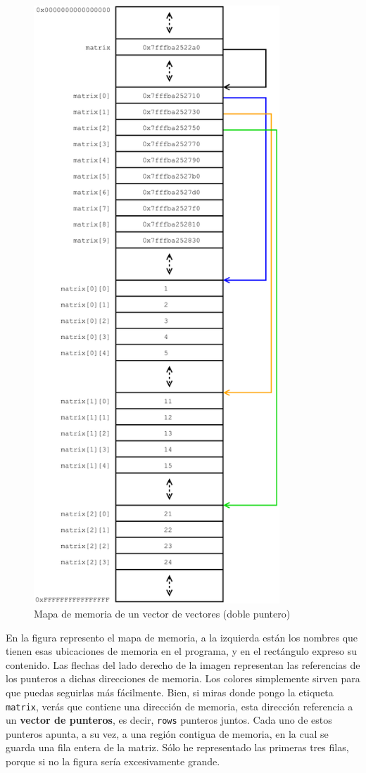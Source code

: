 \documentclass[a4paper]{article}
\begin{document}
\begin{figure}[H]
    \center
    \includegraphics[height=225mm]{double_pointer_map}
    \caption{Mapa de memoria de un vector de vectores (doble puntero)}
    \label{img:double_pointer_map}
\end{figure}

En la figura represento el mapa de memoria, a la izquierda están los nombres
que tienen esas ubicaciones de memoria en el programa, y en el rectángulo
expreso su contenido. Las flechas del lado derecho de la imagen representan las
referencias de los punteros a dichas direcciones de memoria. Los colores
simplemente sirven para que puedas seguirlas más fácilmente. Bien, si miras
donde pongo la etiqueta \verb!matrix!, verás que contiene una dirección de
memoria, esta dirección referencia a un \textbf{vector de punteros}, es decir,
\verb!rows! punteros juntos. Cada uno de estos punteros apunta, a su vez, a una
región
contigua de memoria, en la cual se guarda una fila entera de la matriz. Sólo
he representado las primeras tres filas, porque si no la figura sería excesivamente
grande.
\end{document}
